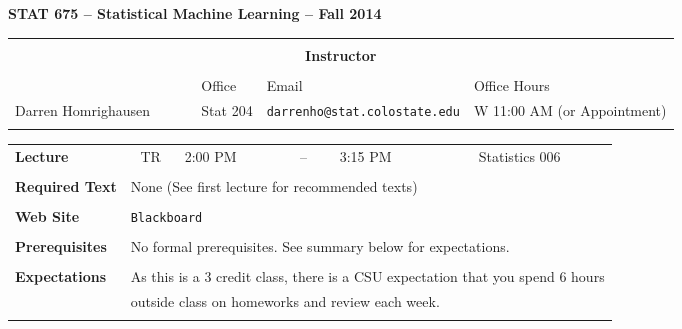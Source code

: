 \documentclass[11pt]{article}
\begin{document}
\baselineskip=13.2pt
\parindent=0pt
\parskip=13.2pt
\pagestyle{empty}

\centerline{\bf \Large STAT 675 -- Statistical Machine Learning -- Fall 2014}

\begin{center}
\begin{tabular}[h]{llll}
\hline
\hline
\\
\multicolumn{4}{c}{\Large \bf Instructor} \\ 
\\
  & Office & Email & Office Hours \\
Darren Homrighausen~~~~~\,& Stat 204 & {\tt darrenho@stat.colostate.edu} & W 11:00 AM (or Appointment) \\
\\
\hline
\hline
\end{tabular}

\begin{tabular}{lclrcrrr}
{\bf Lecture} & TR & 2:00 PM & -- & 3:15 PM & Statistics 006 \\
\\
{\bf Required Text} & \multicolumn{7}{l}{None (See first lecture for recommended texts)}  \\
\\
{\bf Web Site} & \multicolumn{7}{l}{{\tt Blackboard }} \\ %
\\
{\bf Prerequisites} & \multicolumn{7}{l}{No formal prerequisites.  See summary below for expectations.} \\
\\
{\bf Expectations} & \multicolumn{7}{l}{As this is a 3 credit class, there is a CSU expectation that you spend 6 hours} \\
                              & \multicolumn{7}{l}{outside class on homeworks and review each week.} \\
\\
\hline
\hline
\end{tabular}
\end{center}


\end{document}

